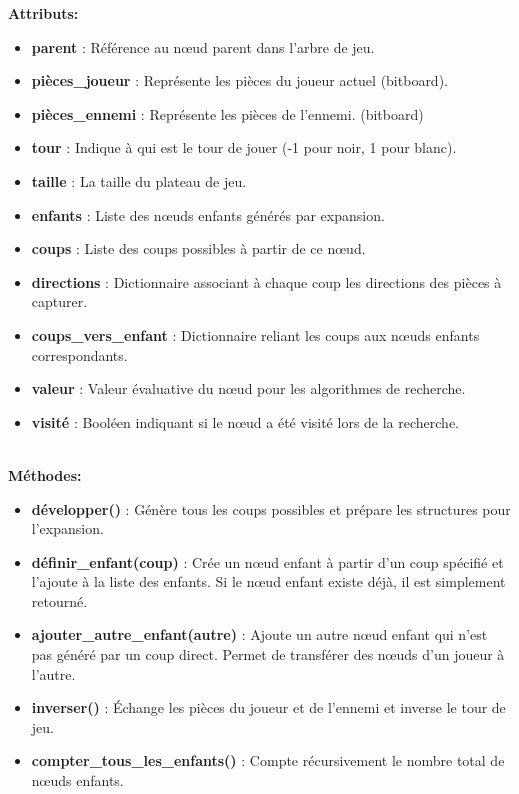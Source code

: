 \noindent\textbf{Attributs:}
\begin{itemize}
    \item \textbf{parent} : Référence au nœud parent dans l'arbre de jeu.
    \item \textbf{pièces\_joueur} : Représente les pièces du joueur actuel (bitboard).
    \item \textbf{pièces\_ennemi} : Représente les pièces de l'ennemi. (bitboard)
    \item \textbf{tour} : Indique à qui est le tour de jouer (-1 pour noir, 1 pour blanc).
    \item \textbf{taille} : La taille du plateau de jeu.
    \item \textbf{enfants} : Liste des nœuds enfants générés par expansion.
    \item \textbf{coups} : Liste des coups possibles à partir de ce nœud.
    \item \textbf{directions} : Dictionnaire associant à chaque coup les directions des pièces à capturer.
    \item \textbf{coups\_vers\_enfant} : Dictionnaire reliant les coups aux nœuds enfants correspondants.
    \item \textbf{valeur} : Valeur évaluative du nœud pour les algorithmes de recherche.
    \item \textbf{visité} : Booléen indiquant si le nœud a été visité lors de la recherche.
\end{itemize}
\leavevmode\\
\textbf{Méthodes:}
\begin{itemize}
    \item \textbf{développer()} : Génère tous les coups possibles et prépare les structures pour l'expansion.
    \item \textbf{définir\_enfant(coup)} : Crée un nœud enfant à partir d'un coup spécifié et l'ajoute à la liste des enfants. Si le nœud enfant existe déjà, il est simplement retourné.
    \item \textbf{ajouter\_autre\_enfant(autre)} : Ajoute un autre nœud enfant qui n'est pas généré par un coup direct. Permet de transférer des nœuds d'un joueur à l'autre.
    \item \textbf{inverser()} : Échange les pièces du joueur et de l'ennemi et inverse le tour de jeu.
    \item \textbf{compter\_tous\_les\_enfants()} : Compte récursivement le nombre total de nœuds enfants.
\end{itemize}


